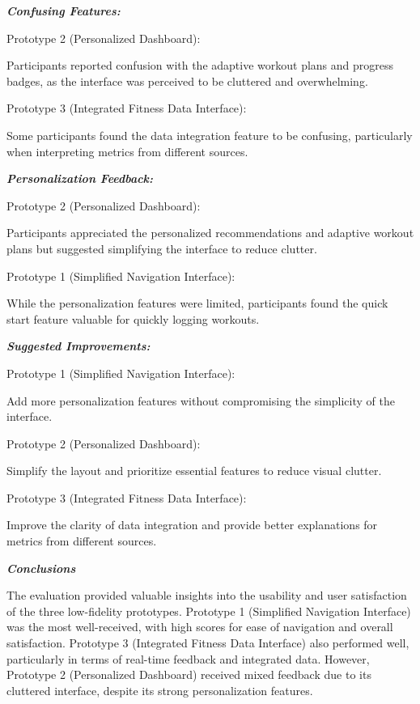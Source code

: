 \documentclass[
	letterpaper, %
]{jdf}
\begin{document}
\textbf{\textit{Confusing Features:
}}
 

Prototype 2 (Personalized Dashboard):

Participants reported confusion with the adaptive workout plans and progress badges, as the interface was perceived to be cluttered and overwhelming.

Prototype 3 (Integrated Fitness Data Interface):

Some participants found the data integration feature to be confusing, particularly when interpreting metrics from different sources.

\textbf{\textit{Personalization Feedback:
}}
 

Prototype 2 (Personalized Dashboard):

Participants appreciated the personalized recommendations and adaptive workout plans but suggested simplifying the interface to reduce clutter.

Prototype 1 (Simplified Navigation Interface):

While the personalization features were limited, participants found the quick start feature valuable for quickly logging workouts.

\textbf{\textit{Suggested Improvements:
}}
 

Prototype 1 (Simplified Navigation Interface):

Add more personalization features without compromising the simplicity of the interface.

Prototype 2 (Personalized Dashboard):

Simplify the layout and prioritize essential features to reduce visual clutter.

Prototype 3 (Integrated Fitness Data Interface):

Improve the clarity of data integration and provide better explanations for metrics from different sources.

\textbf{\textit{Conclusions}}

The evaluation provided valuable insights into the usability and user satisfaction of the three low-fidelity prototypes. Prototype 1 (Simplified Navigation Interface) was the most well-received, with high scores for ease of navigation and overall satisfaction. Prototype 3 (Integrated Fitness Data Interface) also performed well, particularly in terms of real-time feedback and integrated data. However, Prototype 2 (Personalized Dashboard) received mixed feedback due to its cluttered interface, despite its strong personalization features.
\end{document}
